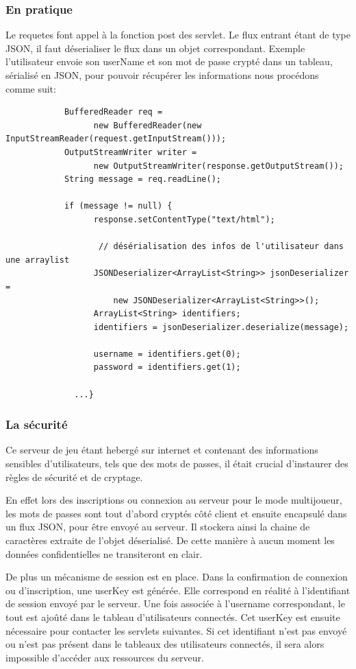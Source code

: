 \documentclass[a4paper,11pt]{report}
\begin{document}
		
		\subsubsection{En pratique}
		
		Le requetes font appel à la fonction post des servlet. Le flux entrant étant
		de type JSON, il faut déserialiser le flux dans un objet correspondant. Exemple
		l'utilisateur envoie son userName et son mot de passe crypté dans un tableau,
		sérialisé en JSON, pour pouvoir récupérer les informations nous procédons
		comme suit: 
		
		\begin{verbatim}
			BufferedReader req = 
				  new BufferedReader(new InputStreamReader(request.getInputStream()));
			OutputStreamWriter writer = 
				  new OutputStreamWriter(response.getOutputStream());
			String message = req.readLine();
			
			if (message != null) {
				  response.setContentType("text/html");
				
				   // désérialisation des infos de l'utilisateur dans une arraylist 
				  JSONDeserializer<ArrayList<String>> jsonDeserializer = 
					  new JSONDeserializer<ArrayList<String>>();
				  ArrayList<String> identifiers;
				  identifiers = jsonDeserializer.deserialize(message);
				
				  username = identifiers.get(0);
				  password = identifiers.get(1);
				  
			  ...}
		\end{verbatim}
		
		
		\subsubsection{La sécurité}
		Ce serveur de jeu étant hebergé sur internet et contenant des informations
		sensibles d'utilisateurs, tels que des mots de passes, il était crucial
		d'instaurer des règles de sécurité et de cryptage. 
		
		En effet lors des inscriptions ou connexion au serveur pour le mode
		multijoueur, les mots de passes sont tout d'abord cryptés côté client et
		ensuite encapsulé dans un flux JSON, pour être envoyé au serveur. Il stockera
		ainsi la chaine de caractères extraite de l'objet déserialisé. De cette
		manière à aucun moment les données confidentielles ne transiteront en clair.
		
		De plus un mécanisme de session est en place. Dans la confirmation de
		connexion ou d'inscription, une userKey est générée. Elle correspond en
		réalité à l'identifiant de session envoyé par le serveur. Une fois associée
		à l'username correspondant, le tout est ajoûté dans le tableau d'utilisateurs
		connectés.
		Cet userKey est ensuite nécessaire pour contacter les servlets suivantes. Si
		cet identifiant n'est pas envoyé ou n'est pas présent dans le tableaux des
		utilisateurs connectés, il sera alors impossible d'accéder aux ressources du
		serveur.
		
\end{document}
